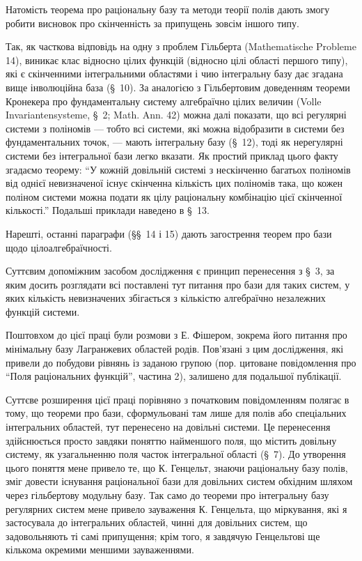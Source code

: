\documentclass[11pt]{article}
\begin{document}
Натомість теорема про раціональну базу та методи теорії полів дають змогу робити висновок про скінченність за припущень зовсім іншого типу.

Так, як часткова відповідь на одну з проблем Гільберта (Mathematische Probleme 14), виникає клас відносно цілих функцій (відносно цілі області першого типу), які є скінченними інтегральними областями і чию інтегральну базу дає згадана вище інволюційна база (\S\ 10). За аналогією з Гільбертовим доведенням теореми Кронекера про фундаментальну систему алгебраїчно цілих величин (Volle Invariantensysteme, \S\ 2; Math. Ann. 42) можна далі показати, що всі регулярні системи з поліномів --- тобто всі системи, які можна відобразити в системи без фундаментальних точок, --- мають інтегральну базу (\S\ 12), тоді як нерегулярні системи без інтегральної бази легко вказати. Як простий приклад цього факту згадаємо теорему: ``У кожній довільній системі з нескінченно багатьох поліномів від однієї невизначеної існує скінченна кількість цих поліномів така, що кожен поліном системи можна подати як цілу раціональну комбінацію цієї скінченної кількості.'' Подальші приклади наведено в \S\ 13.

Нарешті, останні параграфи (\S\S\ 14 і 15) дають загострення теорем про бази щодо цілоалгебраїчності.

Суттєвим допоміжним засобом дослідження є принцип перенесення з \S\ 3, за яким досить розглядати всі поставлені тут питання про бази для таких систем, у яких кількість невизначених збігається з кількістю алгебраїчно незалежних функцій системи.

Поштовхом до цієї праці були розмови з Е. Фішером, зокрема його питання про мінімальну базу Лагранжевих областей родів. Пов'язані з цим дослідження, які привели до побудови рівнянь із заданою групою (пор. цитоване повідомлення про ``Поля раціональних функцій'', частина 2), залишено для подальшої публікації.

Суттєве розширення цієї праці порівняно з початковим повідомленням полягає в тому, що теореми про бази, сформульовані там лише для полів або спеціальних інтегральних областей, тут перенесено на довільні системи. Це перенесення здійснюється просто завдяки поняттю найменшого поля, що містить довільну систему, як узагальненню поля часток інтегральної області (\S\ 7). До утворення цього поняття мене привело те, що К. Генцельт, знаючи раціональну базу полів, зміг довести існування раціональної бази для довільних систем обхідним шляхом через гільбертову модульну базу. Так само до теореми про інтегральну базу регулярних систем мене привело зауваження К. Генцельта, що міркування, які я застосувала до інтегральних областей, чинні для довільних систем, що задовольняють ті самі припущення; крім того, я завдячую Генцельтові ще кількома окремими меншими зауваженнями.
\end{document}
